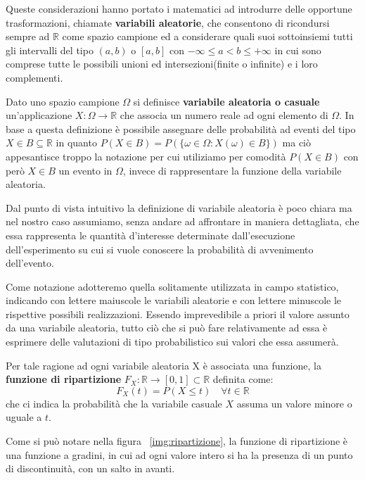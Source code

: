 \documentclass[a4paper,12pt, oneside]{book}
\newcommand{\numberset}{\mathbb}
\newcommand{\R}{\numberset{R}}
\begin{document}
Queste considerazioni hanno portato i matematici ad introdurre delle opportune trasformazioni,
chiamate \textbf{variabili aleatorie}, che consentono di ricondursi sempre ad $\R$ come spazio campione
ed a considerare quali suoi sottoinsiemi tutti gli intervalli del tipo $(a,b)$ o $[a,b]$ 
con $-\infty \leq a < b \leq +\infty$ in cui sono comprese tutte le possibili unioni ed intersezioni(finite o
infinite) e i loro complementi.

Dato uno spazio campione $\Omega$ si definisce \textbf{variabile aleatoria o casuale} un'applicazione $X:\Omega \to \R$
che associa un numero reale ad ogni elemento di $\Omega$.\newline
In base a questa definizione è possibile assegnare delle probabilità ad eventi del tipo $X \in B \subseteq \R$
in quanto $P(X \in B) = P(\{\omega \in \Omega : X(\omega) \in B\})$ ma ciò appesantisce troppo la notazione 
per cui utiliziamo per comodità $P(X \in B)$ con però $X \in B$ un evento in $\Omega$, invece di rappresentare
la funzione della variabile aleatoria.

Dal punto di vista intuitivo la definizione di variabile aleatoria è poco chiara ma nel nostro caso assumiamo,
senza andare ad affrontare in maniera dettagliata, che essa rappresenta le quantità d'interesse determinate
dall'esecuzione dell'esperimento su cui si vuole conoscere la probabilità di avvenimento dell'evento.

Come notazione adotteremo quella solitamente utilizzata in campo statistico,
indicando con lettere maiuscole le variabili aleatorie e con lettere minuscole le rispettive possibili realizzazioni.\newline
Essendo imprevedibile a priori il valore assunto da una variabile aleatoria, tutto ciò che si può fare 
relativamente ad essa è esprimere delle valutazioni di tipo probabilistico sui valori che essa assumerà.

Per tale ragione ad ogni variabile aleatoria X è associata una funzione, la \textbf{funzione di ripartizione}
$F_X: \R \to [0, 1] \subset \R$ definita come:
\[ F_X(t) = P(X \leq t) \quad \forall t \in \R \]
che ci indica la probabilità che la variabile casuale $X$ assuma un valore minore o uguale a $t$.

Come si può notare nella figura ~\ref{img:ripartizione}, la funzione di ripartizione è una funzione a gradini,
in cui ad ogni valore intero si ha la presenza di un punto di discontinuità, con un salto in avanti.
\end{document}
